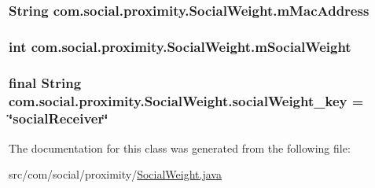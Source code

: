 \subsubsection[{m\+Mac\+Address}]{\setlength{\rightskip}{0pt plus 5cm}String com.\+social.\+proximity.\+Social\+Weight.\+m\+Mac\+Address\hspace{0.3cm}{\ttfamily [private]}}\label{classcom_1_1social_1_1proximity_1_1_social_weight_aed1c91d7a26e69969def12d0fe48e4a4}
\hypertarget{classcom_1_1social_1_1proximity_1_1_social_weight_ae500aa203aee4493c114fbd2bbeb654c}{}
\subsubsection[{m\+Social\+Weight}]{\setlength{\rightskip}{0pt plus 5cm}int com.\+social.\+proximity.\+Social\+Weight.\+m\+Social\+Weight\hspace{0.3cm}{\ttfamily [private]}}\label{classcom_1_1social_1_1proximity_1_1_social_weight_ae500aa203aee4493c114fbd2bbeb654c}
\hypertarget{classcom_1_1social_1_1proximity_1_1_social_weight_a1257231715589b7e1fc3dd5804d6eb9b}{}
\subsubsection[{social\+Weight\+\_\+key}]{\setlength{\rightskip}{0pt plus 5cm}final String com.\+social.\+proximity.\+Social\+Weight.\+social\+Weight\+\_\+key = \char`\"{}social\+Receiver\char`\"{}\hspace{0.3cm}{\ttfamily [static]}}\label{classcom_1_1social_1_1proximity_1_1_social_weight_a1257231715589b7e1fc3dd5804d6eb9b}


The documentation for this class was generated from the following file\+:\begin{DoxyCompactItemize}
\item 
src/com/social/proximity/\hyperlink{_social_weight_8java}{Social\+Weight.\+java}\end{DoxyCompactItemize}
